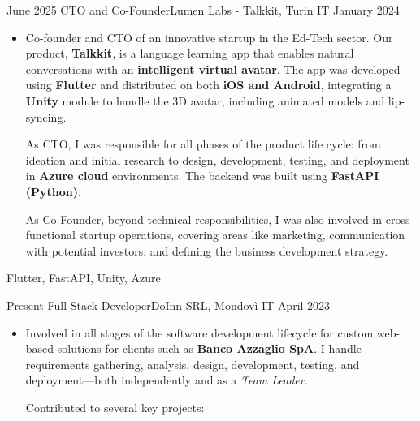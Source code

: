 \begin{experiences}

\experience
{June 2025}   {CTO and Co-Founder}{Lumen Labs - Talkkit, Turin IT}
{January 2024} {
	\begin{itemize}
	\item Co-founder and CTO of an innovative startup in the Ed-Tech sector. Our product, \textbf{Talkkit}, is a language learning app that enables natural conversations with an \textbf{intelligent virtual avatar}. The app was developed using \textbf{Flutter} and distributed on both \textbf{iOS and Android}, integrating a \textbf{Unity} module to handle the 3D avatar, including animated models and lip-syncing.

	As CTO, I was responsible for all phases of the product life cycle: from ideation and initial research to design, development, testing, and deployment in \textbf{Azure cloud} environments. The backend was built using \textbf{FastAPI (Python)}.

	As Co-Founder, beyond technical responsibilities, I was also involved in cross-functional startup operations, covering areas like marketing, communication with potential investors, and defining the business development strategy.
	\end{itemize}
}
{Flutter, FastAPI, Unity, Azure}

\emptySeparator
\emptySeparator

\experience
{Present}   {Full Stack Developer}{DoInn SRL, Mondovì IT}
{April 2023} {
	\begin{itemize}
	\item Involved in all stages of the software development lifecycle for custom web-based solutions for clients such as \textbf{Banco Azzaglio SpA}. I handle requirements gathering, analysis, design, development, testing, and deployment—both independently and as a \textit{Team Leader}.

	Contributed to several key projects:


\end{itemize}}
\end{experiences}
